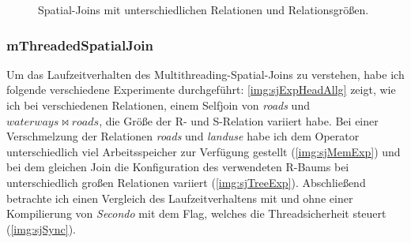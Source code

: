 \documentclass[a4paper,12pt,twoside]{article}
\newcommand{\Fb}[1]{\textit{#1}} %
\begin{document}
\begin{figure}[H]
	\centering
	\qquad	
	\caption{Spatial-Joins mit unterschiedlichen Relationen und Relationsgrößen.}
	\label{img:sjExpHeadAllg}
\end{figure}

\subsubsection{mThreadedSpatialJoin}
\label{exp:sj}

Um das Laufzeitverhalten des Multithreading-Spatial-Joins zu verstehen, habe ich folgende verschiedene Experimente durchgeführt: \autoref{img:sjExpHeadAllg} zeigt, wie ich bei verschiedenen Relationen, einem Selfjoin von \Fb{roads} und $waterways \bowtie roads$, die Größe der R- und S-Relation variiert habe. Bei einer Verschmelzung der Relationen \Fb{roads} und \Fb{landuse} habe ich dem Operator unterschiedlich viel Arbeitsspeicher zur Verfügung gestellt (\autoref{img:sjMemExp}) und bei dem gleichen Join die Konfiguration des verwendeten R-Baums bei unterschiedlich großen Relationen variiert (\autoref{img:sjTreeExp}). Abschließend betrachte ich einen Vergleich des Laufzeitverhaltens mit und ohne einer Kompilierung von \Fb{Secondo} mit dem Flag, welches die Threadsicherheit steuert (\autoref{img:sjSync}). 
\end{document}
